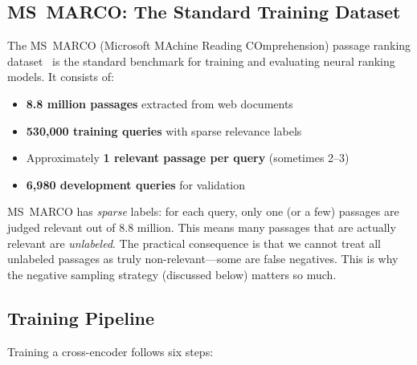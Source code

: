 \documentclass[11pt,a4paper]{article}
\theoremstyle{definition}
\theoremstyle{plain}
\begin{document}
\subsection{MS~MARCO: The Standard Training Dataset}

The MS~MARCO (Microsoft MAchine Reading COmprehension) passage ranking dataset~\cite{nguyen2016ms} is the standard benchmark for training and evaluating neural ranking models. It consists of:

\begin{itemize}
    \item \textbf{8.8 million passages} extracted from web documents
    \item \textbf{530{,}000 training queries} with sparse relevance labels
    \item Approximately \textbf{1 relevant passage per query} (sometimes 2--3)
    \item \textbf{6{,}980 development queries} for validation
\end{itemize}

\begin{pitfall}
MS~MARCO has \emph{sparse} labels: for each query, only one (or a few) passages are judged relevant out of 8.8 million. This means many passages that are actually relevant are \emph{unlabeled}. The practical consequence is that we cannot treat all unlabeled passages as truly non-relevant---some are false negatives. This is why the negative sampling strategy (discussed below) matters so much.
\end{pitfall}

\subsection{Training Pipeline}

Training a cross-encoder follows six steps:
\end{document}
